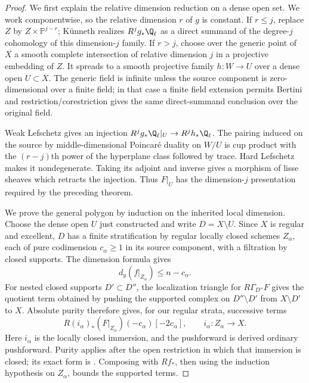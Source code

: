 \begin{proof}
We first explain the relative dimension reduction on a dense open set. We work componentwise, so the relative dimension $r$ of $g$ is constant. If $r\leq j$, replace $Z$ by $Z\times\mathbb P^{j-r}$; K\"unneth realizes $R^jg_*\Q_\ell$ as a direct summand of the degree-$j$ cohomology of this dimension-$j$ family. If $r>j$, choose over the generic point of $X$ a smooth complete intersection of relative dimension $j$ in a projective embedding of $Z$. It spreads to a smooth projective family $h:W\to U$ over a dense open $U\subset X$. The generic field is infinite unless the source component is zero-dimensional over a finite field; in that case a finite field extension permits Bertini and restriction/corestriction gives the same direct-summand conclusion over the original field.

Weak Lefschetz gives an injection $R^jg_*\Q_\ell|_U\to R^jh_*\Q_\ell$. The pairing induced on the source by middle-dimensional Poincar\'e duality on $W/U$ is cup product with the $(r-j)$th power of the hyperplane class followed by trace. Hard Lefschetz makes it nondegenerate. Taking its adjoint and inverse gives a morphism of lisse sheaves which retracts the injection. Thus $F|_U$ has the dimension-$j$ presentation required by the preceding theorem.

We prove the general polygon by induction on the inherited local dimension. Choose the dense open $U$ just constructed and write $D=X\setminus U$. Since $X$ is regular and excellent, $D$ has a finite stratification by regular locally closed schemes $Z_\alpha$, each of pure codimension $c_\alpha\geq1$ in its source component, with a filtration by closed supports. The dimension formula gives
\[
 d_y(f|_{Z_\alpha})\leq n-c_\alpha.
\]
For nested closed supports $D'\subset D''$, the localization triangle for $R\Gamma_{D''}F$ gives the quotient term obtained by pushing the supported complex on $D''\setminus D'$ from $X\setminus D'$ to $X$. Absolute purity therefore gives, for our regular strata, successive terms
\[
 R(i_\alpha)_*(F|_{Z_\alpha})(-c_\alpha)[-2c_\alpha],
 \qquad i_\alpha:Z_\alpha\longrightarrow X.
\]
Here $i_\alpha$ is the locally closed immersion, and the pushforward is derived ordinary pushforward. Purity applies after the open restriction in which that immersion is closed; its exact form is \citet[Corollary 3.1.2]{c_riou2014}. Composing with $Rf_*$, then using the induction hypothesis on $Z_\alpha$, bounds the supported terms.


\end{proof}
